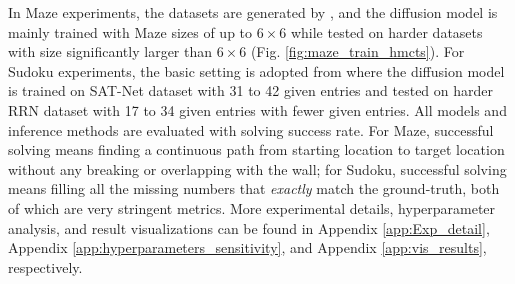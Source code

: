 In Maze experiments, the datasets are generated by \citet{ivanitskiy2023configurable}, and the diffusion model is mainly trained with Maze sizes of up to $6\times6$ while tested on harder datasets with size significantly larger than $6\times6$ (Fig. \ref{fig:maze_train_hmcts}). For Sudoku experiments, the basic setting is adopted from \citet{du2024learning} where the diffusion model is trained on SAT-Net dataset with 31 to 42 given entries \citep{wang2019satnet} and tested on harder RRN dataset with 17 to 34 given entries \citep{palm2018recurrent} with fewer given entries. All models and inference methods are evaluated with solving success rate. For Maze, successful solving means finding a continuous path from starting location to target location without any breaking or overlapping with the wall; for Sudoku, successful solving means filling all the missing numbers that \emph{exactly} match the ground-truth, both of which are very stringent metrics. More experimental details, hyperparameter analysis, and result visualizations can be found in Appendix \ref{app:Exp_detail}, Appendix \ref{app:hyperparameters_sensitivity}, and Appendix \ref{app:vis_results}, respectively.
